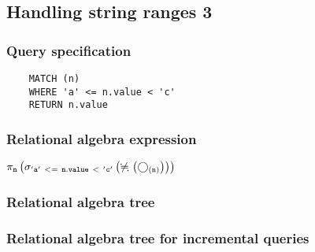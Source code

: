 	\subsection{Handling string ranges 3}

	\subsubsection*{Query specification}

	\begin{lstlisting}
	MATCH (n)
	WHERE 'a' <= n.value < 'c'
	RETURN n.value
	\end{lstlisting}


	\subsubsection*{Relational algebra expression}

	$\projection{\var{n}} \left(\selection{\mathtt{'a'~<=~n.value~<~'c'}} \left(\alldifferent{} \left(\getvertices{n}{}\right)\right)\right)$

	\subsubsection*{Relational algebra tree}


	\subsubsection*{Relational algebra tree for incremental queries}


